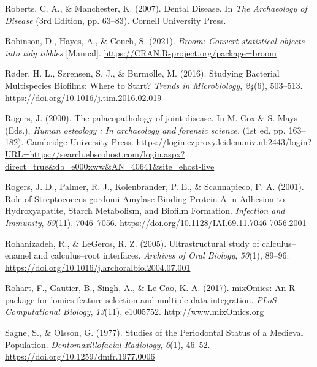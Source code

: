 \documentclass[
  letterpaper,
]{book}
\newlength{\cslhangindent}
\newlength{\cslentryspacingunit} %
\newenvironment{CSLReferences}[2] %
 {%
  \setlength{\parindent}{0pt}
  \ifodd #1
  \let\oldpar\par
  \def\par{\hangindent=\cslhangindent\oldpar}
  \fi
  \setlength{\parskip}{#2\cslentryspacingunit}
 }%
 {}
\begin{document}
\begin{CSLReferences}{1}{0}
\leavevmode{}%
Roberts, C. A., \& Manchester, K. (2007). Dental {Disease}. In \emph{The
{Archaeology} of {Disease}} (3rd Edition, pp. 63--83). {Cornell
University Press}.

\leavevmode{}%
Robinson, D., Hayes, A., \& Couch, S. (2021). \emph{Broom: {Convert}
statistical objects into tidy tibbles} {[}Manual{]}.
\url{https://CRAN.R-project.org/package=broom}

\leavevmode{}%
Røder, H. L., Sørensen, S. J., \& Burmølle, M. (2016). Studying
{Bacterial Multispecies Biofilms}: {Where} to {Start}? \emph{Trends in
Microbiology}, \emph{24}(6), 503--513.
\url{https://doi.org/10.1016/j.tim.2016.02.019}

\leavevmode{}%
Rogers, J. (2000). The palaeopathology of joint disease. In M. Cox \& S.
Mays (Eds.), \emph{Human osteology : {In} archaeology and forensic
science.} (1st ed, pp. 163--182). {Cambridge University Press}.
\url{https://login.ezproxy.leidenuniv.nl:2443/login?URL=https://search.ebscohost.com/login.aspx?direct=true\&db=e000xww\&AN=40641\&site=ehost-live}

\leavevmode{}%
Rogers, J. D., Palmer, R. J., Kolenbrander, P. E., \& Scannapieco, F. A.
(2001). Role of {Streptococcus} gordonii {Amylase-Binding Protein A} in
{Adhesion} to {Hydroxyapatite}, {Starch Metabolism}, and {Biofilm
Formation}. \emph{Infection and Immunity}, \emph{69}(11), 7046--7056.
\url{https://doi.org/10.1128/IAI.69.11.7046-7056.2001}

\leavevmode{}%
Rohanizadeh, R., \& LeGeros, R. Z. (2005). Ultrastructural study of
calculus--enamel and calculus--root interfaces. \emph{Archives of Oral
Biology}, \emph{50}(1), 89--96.
\url{https://doi.org/10.1016/j.archoralbio.2004.07.001}

\leavevmode{}%
Rohart, F., Gautier, B., Singh, A., \& Le Cao, K.-A. (2017). {mixOmics}:
{An R} package for 'omics feature selection and multiple data
integration. \emph{PLoS Computational Biology}, \emph{13}(11), e1005752.
\url{http://www.mixOmics.org}

\leavevmode{}%
Sagne, S., \& Olsson, G. (1977). Studies of the {Periodontal Status} of
a {Medieval Population}. \emph{Dentomaxillofacial Radiology},
\emph{6}(1), 46--52. \url{https://doi.org/10.1259/dmfr.1977.0006}


\end{CSLReferences}
\end{document}
